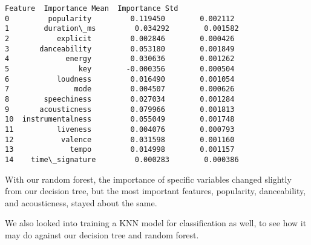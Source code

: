 \documentclass[11pt]{article}
\makeatletter
\newcommand{\boxspacing}{\kern\kvtcb@left@rule\kern\kvtcb@boxsep}
\newcommand{\prompt}[4]{
        {\ttfamily\llap{{\color{#2}[#3]:\hspace{3pt}#4}}\vspace{-\baselineskip}}
    }
\makeatother
\begin{document}
            \begin{tcolorbox}[breakable, size=fbox, boxrule=.5pt, pad at break*=1mm, opacityfill=0]
\prompt{Out}{outcolor}{44}{\boxspacing}
\begin{Verbatim}[commandchars=\\\{\}]
             Feature  Importance Mean  Importance Std
0         popularity         0.119450        0.002112
1        duration\_ms         0.034292        0.001582
2           explicit         0.002846        0.000426
3       danceability         0.053180        0.001849
4             energy         0.030636        0.001262
5                key        -0.000356        0.000504
6           loudness         0.016490        0.001054
7               mode         0.004507        0.000626
8        speechiness         0.027034        0.001284
9       acousticness         0.079966        0.001813
10  instrumentalness         0.055049        0.001748
11          liveness         0.004076        0.000793
12           valence         0.031598        0.001160
13             tempo         0.014998        0.001157
14    time\_signature         0.000283        0.000386
\end{Verbatim}
\end{tcolorbox}
        
    With our random forest, the importance of specific variables changed
slightly from our decision tree, but the most important features,
popularity, danceability, and acousticness, stayed about the same.

We also looked into training a KNN model for classification as well, to
see how it may do against our decision tree and random forest.
\end{document}
